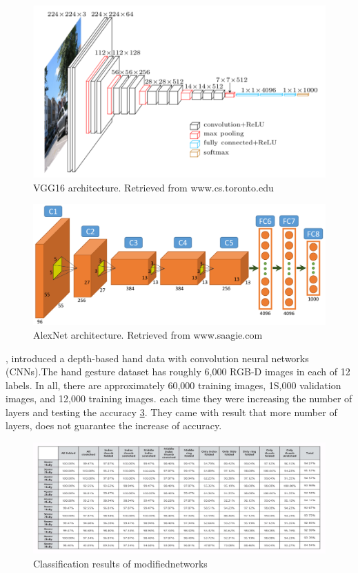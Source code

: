 \documentclass[12pt]{report}
\begin{document}
\begin{figure}[h]
    \centering
    \includegraphics[width=.9\textwidth]{images/vgg16.png}
    \caption{VGG16 architecture. Retrieved from www.cs.toronto.edu}
    \label{fig:vgg16}
\end{figure}
\begin{figure}[h]
    \centering
    \includegraphics[width=.8\textwidth]{images/alexnet.png}
    \caption{AlexNet architecture. Retrieved from www.saagie.com}
    \label{fig:alexnet}
\end{figure}


\clearpage

    \cite{Pyo2016}, introduced a depth-based hand data with convolution
    neural networks (CNNs).The hand gesture dataset has roughly 6,000 RGB-D images in
    each of 12 labels. In all, there are approximately 60,000
    training images, 1S,000 validation images, and 12,000 training images.
    each time they were increasing the number of layers and testing the accuracy \ref{fig:depth_cnn}.
    They came with result that more number of layers, does not guarantee the increase of accuracy.
\bigbreak

\begin{figure}[h]
    \centering
    \includegraphics[width=\textwidth]{images/depth_cnn.png}
    \caption{Classification results of  modifiednetworks}
    \label{fig:depth_cnn}
\end{figure}
\end{document}
